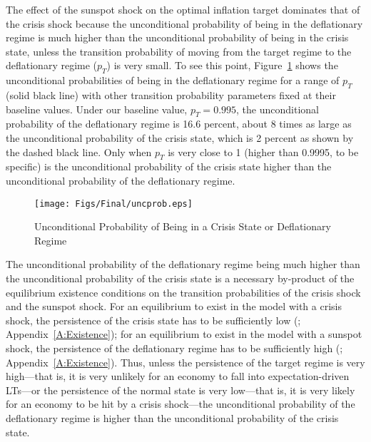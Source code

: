 \documentclass[11pt]{article}
\begin{document}

    The effect of the sunspot shock on the optimal inflation target dominates that of the crisis shock because the unconditional probability of being in the deflationary regime is much higher than the unconditional probability of being in the crisis state, unless the transition probability of moving from the target regime to the deflationary regime ($p_{T}$) is very small. To see this point, Figure~\ref {fig:UncProb} shows the unconditional probabilities of being in the deflationary regime for a range of $p_{T}$ (solid black line) with other transition probability parameters fixed at their baseline values. Under our baseline value, $p_{T}=0.995$, the unconditional probability of the deflationary regime is 16.6 percent, about 8 times as large as the unconditional probability of the crisis state, which is 2 percent as shown by the dashed black line. Only when $p_{T}$ is very close to 1 (higher than 0.9995, to be specific) is the unconditional probability of the crisis state higher than the unconditional probability of the deflationary regime.

	\begin{figure}[!h]
		\begin{center}
			\caption{Unconditional Probability of Being in a Crisis State or Deflationary Regime\label{fig:UncProb}}
			\texttt{[image: Figs/Final/uncprob.eps]}\\
		\end{center}
	\end{figure}

	The unconditional probability of the deflationary regime being much higher than the unconditional probability of the crisis state is a necessary by-product of the equilibrium existence conditions on the transition probabilities of the crisis shock and the sunspot shock. For an equilibrium to exist in the model with a crisis shock, the persistence of the crisis state has to be sufficiently low (\citet{NakataSchmidtForthcomingJME}; Appendix~\ref{A:Existence}); for an equilibrium to exist in the model with a sunspot shock, the persistence of the deflationary regime has to be sufficiently high (\citet{NakataSchmidt2019}; Appendix~\ref{A:Existence}). Thus, unless the persistence of the target regime is very high---that is, it is very unlikely for an economy to fall into expectation-driven LTs---or the persistence of the normal state is very low---that is, it is very likely for an economy to be hit by a crisis shock---the unconditional probability of the deflationary regime is higher than the unconditional probability of the crisis state.
\end{document}
